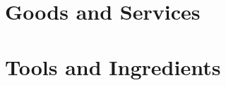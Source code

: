 \chapter{Goods and Services}\label{ch:goodsAndServices}

	

	

	

	



\chapter{Tools and Ingredients}\label{sec:craftingItems}

	

	